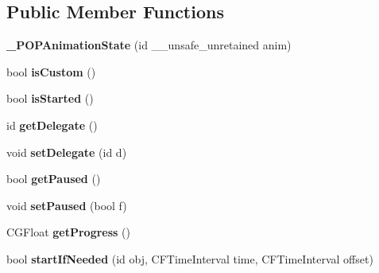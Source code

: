 \subsection*{Public Member Functions}
\begin{DoxyCompactItemize}
\item 
\mbox{\label{struct___p_o_p_animation_state_a70cac0cdc5a3c24e9dd8bc6e60f5845a}} 
{\bfseries \+\_\+\+P\+O\+P\+Animation\+State} (id \+\_\+\+\_\+unsafe\+\_\+unretained anim)
\item 
\mbox{\label{struct___p_o_p_animation_state_a27c516881f0a454488a8d02dfcb6ef67}} 
bool {\bfseries is\+Custom} ()
\item 
\mbox{\label{struct___p_o_p_animation_state_a3f134844d40e03c3216347f9974cd4bd}} 
bool {\bfseries is\+Started} ()
\item 
\mbox{\label{struct___p_o_p_animation_state_ad9e4142f0d09a56ec083f77cb0cb04fe}} 
id {\bfseries get\+Delegate} ()
\item 
\mbox{\label{struct___p_o_p_animation_state_adee293cc081cbbfb6e0ee437a874eeca}} 
void {\bfseries set\+Delegate} (id d)
\item 
\mbox{\label{struct___p_o_p_animation_state_a32a5c375f98b459ebecb3c8e0feac5b3}} 
bool {\bfseries get\+Paused} ()
\item 
\mbox{\label{struct___p_o_p_animation_state_a905f2589ff378d83c489b579b1010e58}} 
void {\bfseries set\+Paused} (bool f)
\item 
\mbox{\label{struct___p_o_p_animation_state_a3b660d839684e968b10696314a3bf9f0}} 
C\+G\+Float {\bfseries get\+Progress} ()
\item 
\mbox{\label{struct___p_o_p_animation_state_a47dba1cab772bd9278e0b7b60d38763f}} 
bool {\bfseries start\+If\+Needed} (id obj, C\+F\+Time\+Interval time, C\+F\+Time\+Interval offset)
\item 

\end{DoxyCompactItemize}

